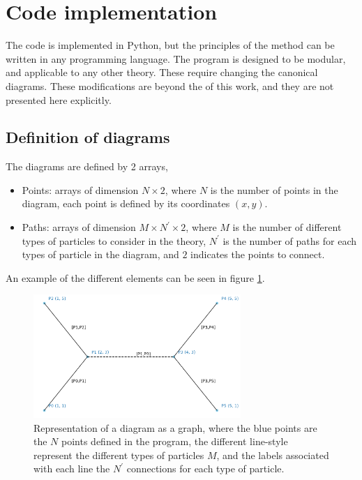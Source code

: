 \documentclass[11pt,a4paper,twoside,pdf]{article}
\numberwithin{equation}{section}
\begin{document}
\clearpage

\section{Code implementation} \label{sec:code}

The code is implemented in Python, but the principles of the method can be written in any 
programming language. The program is designed to be modular, and applicable to any
other theory. These require changing the canonical
diagrams. These modifications are beyond the of this work, and they are not presented
here explicitly.

\subsection{Definition of diagrams}

The diagrams are defined by 2 arrays, 
\begin{itemize}
    \item Points: arrays of dimension $N \times 2$, where $N$ is the number of 
    points in the diagram, each point is defined by its coordinates $(x,y)$.
    \item Paths: arrays of dimension $M \times N^\prime \times 2$, where $M$ is the
    number of different types of particles to consider in the theory, $N^\prime$ 
    is the number of paths for each types of particle in the diagram, and $2$ indicates
    the points to connect.
\end{itemize}

An example of the different elements can be seen in figure \ref{fig:diagram_representation}.

\begin{figure}[h!]
    \centering
    \includegraphics[width=0.7\textwidth]{plots/graph_example.png}
    \caption{Representation of a diagram as a graph, where the blue points are the $N$ points
    defined in the program, the different line-style represent the different types of particles 
    $M$, and the labels associated with each line the $N^\prime$ connections 
    for each type of particle.}
    \label{fig:diagram_representation}
\end{figure}
\end{document}
